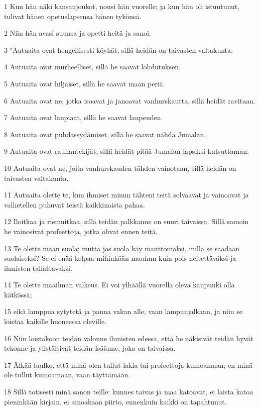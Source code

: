 \par 1 Kun hän näki kansanjoukot, nousi hän vuorelle; ja kun hän oli istuutunut, tulivat hänen opetuslapsensa hänen tykönsä.
\par 2 Niin hän avasi suunsa ja opetti heitä ja sanoi:
\par 3 "Autuaita ovat hengellisesti köyhät, sillä heidän on taivasten valtakunta.
\par 4 Autuaita ovat murheelliset, sillä he saavat lohdutuksen.
\par 5 Autuaita ovat hiljaiset, sillä he saavat maan periä.
\par 6 Autuaita ovat ne, jotka isoavat ja janoavat vanhurskautta, sillä heidät ravitaan.
\par 7 Autuaita ovat laupiaat, sillä he saavat laupeuden.
\par 8 Autuaita ovat puhdassydämiset, sillä he saavat nähdä Jumalan.
\par 9 Autuaita ovat rauhantekijät, sillä heidät pitää Jumalan lapsiksi kutsuttaman.
\par 10 Autuaita ovat ne, joita vanhurskauden tähden vainotaan, sillä heidän on taivasten valtakunta.
\par 11 Autuaita olette te, kun ihmiset minun tähteni teitä solvaavat ja vainoavat ja valhetellen puhuvat teistä kaikkinaista pahaa.
\par 12 Iloitkaa ja riemuitkaa, sillä teidän palkkanne on suuri taivaissa. Sillä samoin he vainosivat profeettoja, jotka olivat ennen teitä.
\par 13 Te olette maan suola; mutta jos suola käy mauttomaksi, millä se saadaan suolaiseksi? Se ei enää kelpaa mihinkään muuhun kuin pois heitettäväksi ja ihmisten tallattavaksi.
\par 14 Te olette maailman valkeus. Ei voi ylhäällä vuorella oleva kaupunki olla kätkössä;
\par 15 eikä lamppua sytytetä ja panna vakan alle, vaan lampunjalkaan, ja niin se loistaa kaikille huoneessa oleville.
\par 16 Niin loistakoon teidän valonne ihmisten edessä, että he näkisivät teidän hyvät tekonne ja ylistäisivät teidän Isäänne, joka on taivaissa.
\par 17 Älkää luulko, että minä olen tullut lakia tai profeettoja kumoamaan; en minä ole tullut kumoamaan, vaan täyttämään.
\par 18 Sillä totisesti minä sanon teille: kunnes taivas ja maa katoavat, ei laista katoa pieninkään kirjain, ei ainoakaan piirto, ennenkuin kaikki on tapahtunut.
